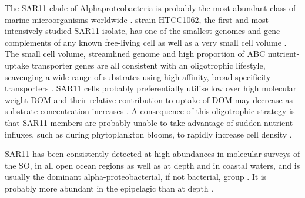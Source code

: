 
The SAR11 clade of Alphaproteobacteria is probably the most abundant class of marine microorganisms worldwide \cite{Morris:2002bn}.
 strain HTCC1062, the first and most intensively studied SAR11 isolate, has one of the smallest genomes and gene complements of any known free-living cell as well as a very small cell volume \cite{Giovannoni:2005ib}.
The small cell volume, streamlined genome and high proportion of ABC nutrient-uptake transporter genes are all consistent with an oligotrophic lifestyle, scavenging a wide range of substrates using high-affinity, broad-specificity transporters \cite{Giovannoni:2005ib,Lauro:2009gx,Sowell:2008ks}.
SAR11 cells probably preferentially utilise low over high molecular weight \ac{DOM} \cite{Malmstrom:2005el} and their relative contribution to uptake of \ac{DOM} may decrease as substrate concentration increases \cite{Alonso:2006dj}.
A consequence of this oligotrophic strategy is that SAR11 members are probably unable to take advantage of sudden nutrient influxes, such as during phytoplankton blooms, to rapidly increase cell density \cite{Tripp:2008dd}.

SAR11 has been consistently detected at high abundances in molecular surveys of the \ac{SO}, in all open ocean regions as well as at depth and in coastal waters, and is usually the dominant alpha-proteobacterial, if not bacterial, group \cite{Giebel:2009hr,Murray:2007db,LopezGarcia:2001vp,Straza:2010io,Jamieson:2012up,GarciaMartinez:2000fu,Ghiglione:2011ee,Murray:2011ib,Piquet:2011fj}.
It is probably more abundant in the epipelagic than at depth \cite{Giebel:2009hr}.

